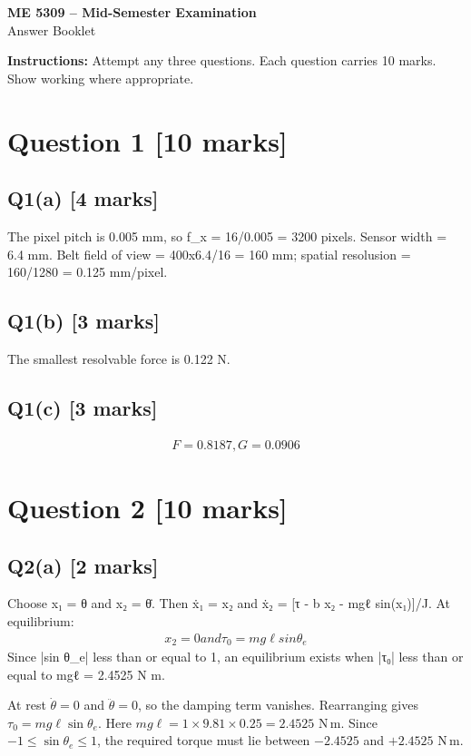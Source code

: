\documentclass[11pt,a4paper]{article}
\begin{document}
\begin{center}
{\Large\bfseries ME 5309 -- Mid-Semester Examination}\\[3pt]
{\large Answer Booklet}\\[8pt]
\end{center}
\textbf{Instructions:} Attempt any three questions. Each question carries 10 marks. Show working where appropriate.
\section*{Question 1 \hfill [10 marks]}
\subsection*{Q1(a) \hfill [4 marks]}

The pixel pitch is 0.005 mm, so f\_x = 16/0.005 = 3200 pixels.
Sensor width = 6.4 mm.
Belt field of view = 400x6.4/16 = 160 mm; spatial resolusion = 160/1280 = 0.125 mm/pixel.

\subsection*{Q1(b) \hfill [3 marks]}

The smallest resolvable force is 0.122 N.

\subsection*{Q1(c) \hfill [3 marks]}

\[\begin{aligned}F = 0.8187, G = 0.0906\end{aligned}\]

\section*{Question 2 \hfill [10 marks]}
\subsection*{Q2(a) \hfill [2 marks]}

Choose x₁ = θ and x₂ = θ̇.
Then ẋ₁ = x₂ and ẋ₂ = [τ - b x₂ - mgℓ sin(x₁)]/J.
At equilibrium:\[\begin{aligned}x_2 = 0 and τ_0 = mg\ell sin \theta_e\end{aligned}\]
Since |sin θ\_e| less than or equal to 1, an equilibrium exists when |τ₀| less than or equal to mgℓ = 2.4525 N m.\par\smallskip At rest $\dot\theta=0$ and $\ddot\theta=0$, so the damping term vanishes. Rearranging gives $\tau_0=mg\ell\sin\theta_e$. Here $mg\ell=1\times9.81\times0.25=2.4525$ N\,m. Since $-1\leq\sin\theta_e\leq1$, the required torque must lie between $-2.4525$ and $+2.4525$ N\,m.
\end{document}
